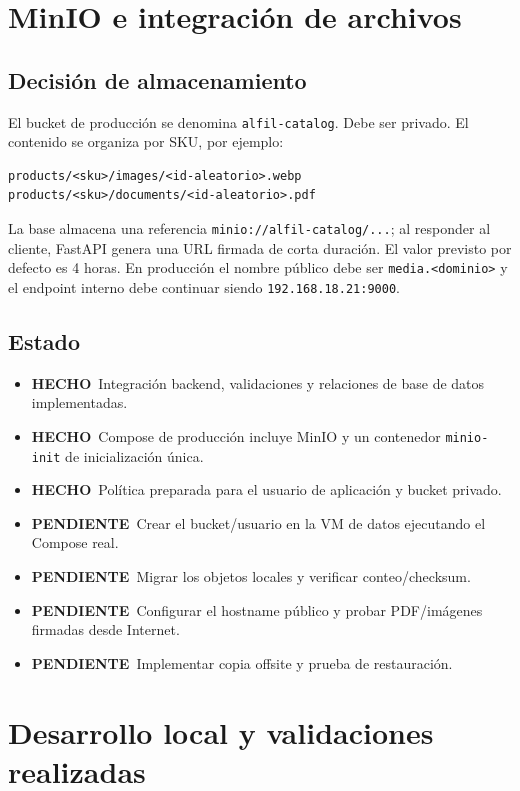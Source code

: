 \documentclass[11pt,a4paper]{article}
\newcommand{\ok}{\textcolor{done}{\textbf{HECHO}}}
\newcommand{\pending}{\textcolor{warning}{\textbf{PENDIENTE}}}
\newcommand{\code}[1]{\nolinkurl{#1}}
\begin{document}
\section{MinIO e integración de archivos}

\subsection{Decisión de almacenamiento}

El bucket de producción se denomina \code{alfil-catalog}. Debe ser privado. El contenido se organiza por SKU, por ejemplo:

\begin{lstlisting}
products/<sku>/images/<id-aleatorio>.webp
products/<sku>/documents/<id-aleatorio>.pdf
\end{lstlisting}

La base almacena una referencia \code{minio://alfil-catalog/...}; al responder al cliente, FastAPI genera una URL firmada de corta duración. El valor previsto por defecto es 4 horas. En producción el nombre público debe ser \code{media.<dominio>} y el endpoint interno debe continuar siendo \code{192.168.18.21:9000}.

\subsection{Estado}

\begin{itemize}
  \item \ok\ Integración backend, validaciones y relaciones de base de datos implementadas.
  \item \ok\ Compose de producción incluye MinIO y un contenedor \code{minio-init} de inicialización única.
  \item \ok\ Política preparada para el usuario de aplicación y bucket privado.
  \item \pending\ Crear el bucket/usuario en la VM de datos ejecutando el Compose real.
  \item \pending\ Migrar los objetos locales y verificar conteo/checksum.
  \item \pending\ Configurar el hostname público y probar PDF/imágenes firmadas desde Internet.
  \item \pending\ Implementar copia offsite y prueba de restauración.
\end{itemize}

\section{Desarrollo local y validaciones realizadas}
\end{document}
